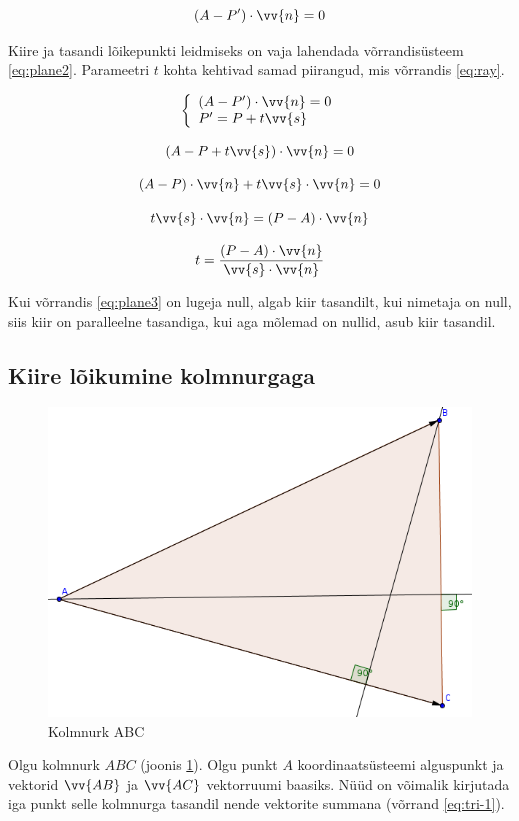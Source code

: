 \documentclass[a4paper,12pt]{report}
\renewcommand{\vec}[1]{\vv{#1}}
\begin{document}
\begin{equation} \label{eq:plane1}
(A - P') \cdot \vec n = 0
\end{equation}

Kiire ja tasandi lõikepunkti leidmiseks on vaja lahendada võrrandisüsteem
\ref{eq:plane2}. Para\-meetri \(t\) kohta kehtivad samad piirangud, mis
võrrandis \ref{eq:ray}.

\begin{equation} \label{eq:plane2}
\left\{
\begin{array}{l}
(A - P') \cdot \vec n = 0 \\
P' = P + t\vec s
\end{array}
\right.
\end{equation}

\[(A - P + t\vec s) \cdot \vec n = 0\]

\[(A - P) \cdot \vec n + t\vec s \cdot \vec n = 0\]

\[t\vec s \cdot \vec n = (P-A) \cdot \vec n\]

\begin{equation} \label{eq:plane3}
t = \frac{(P-A) \cdot \vec n}{\vec s \cdot \vec n}
\end{equation}

Kui võrrandis \ref{eq:plane3} on lugeja null, algab kiir tasandilt, kui
nimetaja on null, siis kiir on paralleelne tasandiga, kui aga mõlemad on
nullid, asub kiir tasandil.

\subsection{Kiire lõikumine kolmnurgaga}

\begin{figure}
\includegraphics[width=0.49	\textwidth]{tri}
\caption{Kolmnurk ABC}
\label{fig:tri}
\end{figure}

Olgu kolmnurk \(ABC\) (joonis \ref{fig:tri}). Olgu punkt \(A\) koordinaatsüsteemi alguspunkt ja
vektorid \(\vec{AB}\) ja \(\vec{AC}\) vektorruumi baasiks. Nüüd on
võimalik kirjutada iga punkt selle kolmnurga tasandil nende vektorite
summana (võrrand \ref{eq:tri-1}).
\end{document}
